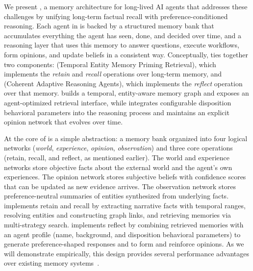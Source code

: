 We present \hindsight, a memory architecture for long-lived AI agents that addresses these challenges by unifying long-term factual recall with preference-conditioned reasoning. Each agent in \our is backed by a structured memory bank that accumulates everything the agent has seen, done, and decided over time, and a reasoning layer that uses this memory to answer questions, execute workflows, form opinions, and update beliefs in a consistent way. Conceptually, \our ties together two components: \tempr (Temporal Entity Memory Priming Retrieval), which
implements the \emph{retain} and \emph{recall} operations over long-term memory, and \cara (Coherent Adaptive Reasoning Agents), which implements the \emph{reflect} operation over that memory.
\tempr builds a temporal, entity-aware memory graph and exposes an agent-optimized retrieval interface, while \cara integrates configurable disposition behavioral parameters into the reasoning process and maintains an explicit opinion network that evolves over time.

At the core of \our is a simple abstraction: a memory bank organized into four logical networks (\emph{world}, \emph{experience}, \emph{opinion}, \emph{observation}) and three core operations (retain, recall, and reflect, as mentioned earlier).
The world and experience networks store objective facts about the external world and the agent's own experiences. The opinion network stores subjective beliefs with confidence scores that can be updated as new evidence arrives. The observation network stores preference-neutral summaries of entities synthesized from underlying facts. \tempr implements retain and recall by extracting narrative facts with temporal ranges, resolving entities and constructing graph links, and retrieving memories via multi-strategy search. \cara implements reflect by combining retrieved memories with an agent profile (name, background, and disposition behavioral parameters) to generate preference-shaped responses and to form and reinforce opinions.
As we will demonstrate empirically, this design provides several performance advantages over existing memory systems~\cite{xu2025mem,liu2025memverse,wang2025karma}. 


